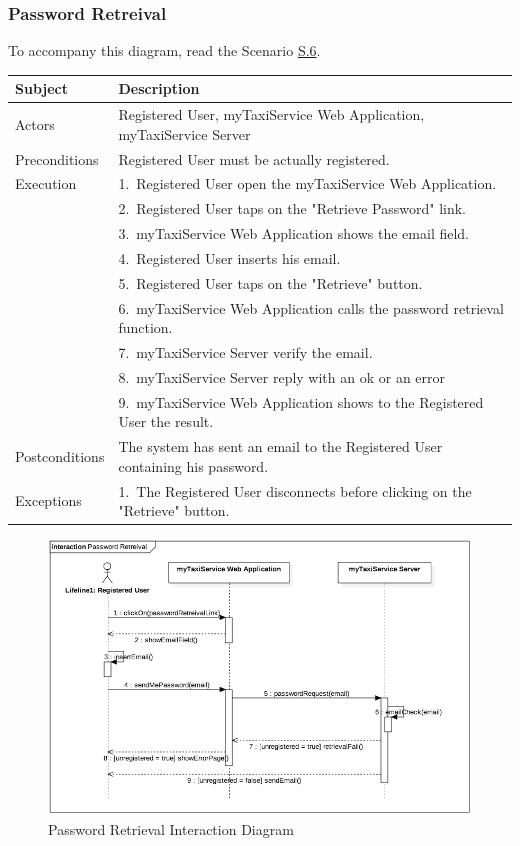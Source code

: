 \subsubsection{Password Retreival}
			To accompany this diagram, read the Scenario \hyperref[sec:PasswordRetrievalScenario]{S.6}.

				\begin{table}[htpb]
					\centering
					\label{tab:PasswordRetrievalDiagramTable}
					\begin{tabularx}{\textwidth}{lp{9cm}}
						\hline
						\hline
							\textbf{Subject}
						& 
							\textbf{Description}\\
						\hline
							Actors	       &  Registered User, myTaxiService Web Application, myTaxiService Server\\
						\hline
							Preconditions  &  Registered User must be actually registered.\\
						\hline
							Execution      &  1.~Registered User open the myTaxiService Web Application.\\
										   &  2.~Registered User taps on the "Retrieve Password" link.\\
										   &  3.~myTaxiService Web Application shows the email field.\\
										   &  4.~Registered User inserts his email.\\
										   &  5.~Registered User taps on the "Retrieve" button.\\
										   &  6.~myTaxiService Web Application calls the password retrieval function.\\
										   &  7.~myTaxiService Server verify the email.\\
										   &  8.~myTaxiService Server reply with an ok or an error\\
										   &  9.~myTaxiService Web Application shows to the Registered User the result.\\
						\hline
							Postconditions &  The system has sent an email to the Registered User containing his password.\\
						\hline
							Exceptions     &  1.~The Registered User disconnects before clicking on the "Retrieve" button.\\
									
						\hline
						\hline
					\end{tabularx}
				\end{table}
				
				\begin{figure}[H]
					\centering
					\includegraphics[width=\textwidth, scale=0.5]{IMG/InteractionDiagrams/PasswordRetrieval.png}
					\caption{Password Retrieval Interaction Diagram}\label{sec:FigureProfileModification}
				\end{figure}
